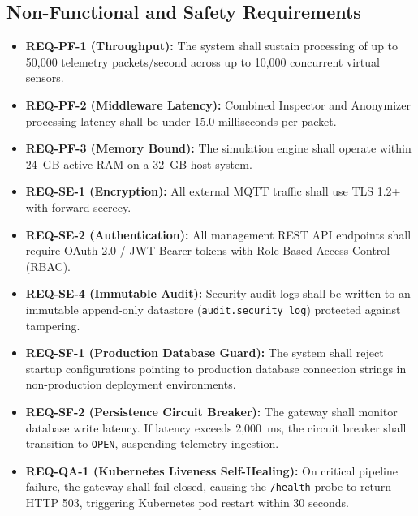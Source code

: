 \subsection{Non-Functional and Safety Requirements}
\begin{itemize}
    \item \textbf{REQ-PF-1 (Throughput):} The system shall sustain processing of up to 50,000 telemetry packets/second across up to 10,000 concurrent virtual sensors.
    \item \textbf{REQ-PF-2 (Middleware Latency):} Combined Inspector and Anonymizer processing latency shall be under 15.0 milliseconds per packet.
    \item \textbf{REQ-PF-3 (Memory Bound):} The simulation engine shall operate within 24~GB active RAM on a 32~GB host system.
    \item \textbf{REQ-SE-1 (Encryption):} All external MQTT traffic shall use TLS 1.2+ with forward secrecy.
    \item \textbf{REQ-SE-2 (Authentication):} All management REST API endpoints shall require OAuth 2.0 / JWT Bearer tokens with Role-Based Access Control (RBAC).
    \item \textbf{REQ-SE-4 (Immutable Audit):} Security audit logs shall be written to an immutable append-only datastore (\texttt{audit.security\_log}) protected against tampering.
    \item \textbf{REQ-SF-1 (Production Database Guard):} The system shall reject startup configurations pointing to production database connection strings in non-production deployment environments.
    \item \textbf{REQ-SF-2 (Persistence Circuit Breaker):} The gateway shall monitor database write latency. If latency exceeds 2,000~ms, the circuit breaker shall transition to \texttt{OPEN}, suspending telemetry ingestion.
    \item \textbf{REQ-QA-1 (Kubernetes Liveness Self-Healing):} On critical pipeline failure, the gateway shall fail closed, causing the \texttt{/health} probe to return HTTP 503, triggering Kubernetes pod restart within 30 seconds.
\end{itemize}

